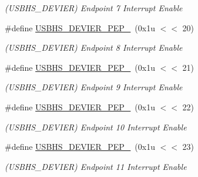 \begin{DoxyCompactItemize}
\begin{DoxyCompactList}\small\item\em (U\+S\+B\+H\+S\+\_\+\+D\+E\+V\+I\+ER) Endpoint 7 Interrupt Enable \end{DoxyCompactList}\item 
\mbox{\label{group__SAMS70__USBHS_ga31087c3b3d3c78d034e7a277f13e85da}} 
\#define \mbox{\hyperlink{group__SAMS70__USBHS_ga31087c3b3d3c78d034e7a277f13e85da}{U\+S\+B\+H\+S\+\_\+\+D\+E\+V\+I\+E\+R\+\_\+\+P\+E\+P\+\_}}~(0x1u $<$$<$ 20)
\begin{DoxyCompactList}\small\item\em (U\+S\+B\+H\+S\+\_\+\+D\+E\+V\+I\+ER) Endpoint 8 Interrupt Enable \end{DoxyCompactList}\item 
\mbox{\label{group__SAMS70__USBHS_ga35c6c650e417e85c0e102c2eb98c1d21}} 
\#define \mbox{\hyperlink{group__SAMS70__USBHS_ga35c6c650e417e85c0e102c2eb98c1d21}{U\+S\+B\+H\+S\+\_\+\+D\+E\+V\+I\+E\+R\+\_\+\+P\+E\+P\+\_}}~(0x1u $<$$<$ 21)
\begin{DoxyCompactList}\small\item\em (U\+S\+B\+H\+S\+\_\+\+D\+E\+V\+I\+ER) Endpoint 9 Interrupt Enable \end{DoxyCompactList}\item 
\mbox{\label{group__SAMS70__USBHS_ga21412998dd56cc4408626fb2c98cadd8}} 
\#define \mbox{\hyperlink{group__SAMS70__USBHS_ga21412998dd56cc4408626fb2c98cadd8}{U\+S\+B\+H\+S\+\_\+\+D\+E\+V\+I\+E\+R\+\_\+\+P\+E\+P\+\_}}~(0x1u $<$$<$ 22)
\begin{DoxyCompactList}\small\item\em (U\+S\+B\+H\+S\+\_\+\+D\+E\+V\+I\+ER) Endpoint 10 Interrupt Enable \end{DoxyCompactList}\item 
\mbox{\label{group__SAMS70__USBHS_gaef695cfb4079c68f92a05817e9885dec}} 
\#define \mbox{\hyperlink{group__SAMS70__USBHS_gaef695cfb4079c68f92a05817e9885dec}{U\+S\+B\+H\+S\+\_\+\+D\+E\+V\+I\+E\+R\+\_\+\+P\+E\+P\+\_}}~(0x1u $<$$<$ 23)
\begin{DoxyCompactList}\small\item\em (U\+S\+B\+H\+S\+\_\+\+D\+E\+V\+I\+ER) Endpoint 11 Interrupt Enable \end{DoxyCompactList}\item 

\end{DoxyCompactItemize}
